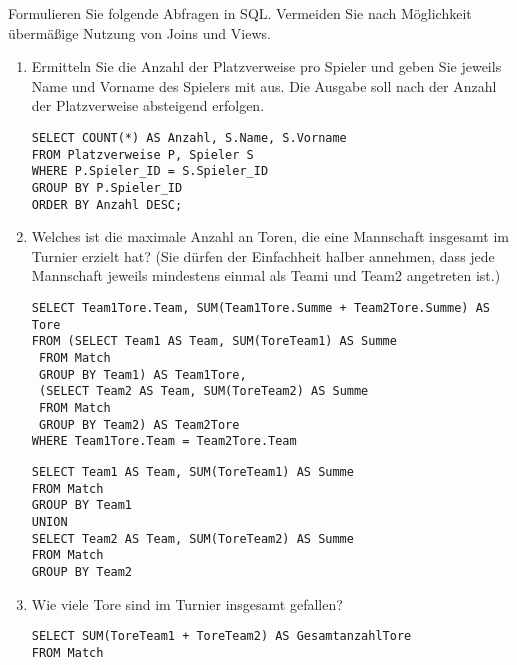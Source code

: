 \documentclass{lehramt-informatik-aufgabe}
\begin{document}
Formulieren Sie folgende Abfragen in SQL. Vermeiden Sie nach Möglichkeit
übermäßige Nutzung von Joins und Views.
\begin{enumerate}


\item Ermitteln Sie die Anzahl der Platzverweise pro Spieler und geben
Sie jeweils Name und Vorname des Spielers mit aus. Die Ausgabe soll nach
der Anzahl der Platzverweise absteigend erfolgen.

\begin{liAntwort}
\begin{verbatim}
SELECT COUNT(*) AS Anzahl, S.Name, S.Vorname
FROM Platzverweise P, Spieler S
WHERE P.Spieler_ID = S.Spieler_ID
GROUP BY P.Spieler_ID
ORDER BY Anzahl DESC;
\end{verbatim}
\end{liAntwort}


\item Welches ist die maximale Anzahl an Toren, die eine Mannschaft
insgesamt im Turnier erzielt hat? (Sie dürfen der Einfachheit halber
annehmen, dass jede Mannschaft jeweils mindestens einmal als Teami und
Team2 angetreten ist.)

\begin{liAntwort}
\begin{verbatim}
SELECT Team1Tore.Team, SUM(Team1Tore.Summe + Team2Tore.Summe) AS Tore
FROM (SELECT Team1 AS Team, SUM(ToreTeam1) AS Summe
 FROM Match
 GROUP BY Team1) AS Team1Tore,
 (SELECT Team2 AS Team, SUM(ToreTeam2) AS Summe
 FROM Match
 GROUP BY Team2) AS Team2Tore
WHERE Team1Tore.Team = Team2Tore.Team
\end{verbatim}

\begin{verbatim}
SELECT Team1 AS Team, SUM(ToreTeam1) AS Summe
FROM Match
GROUP BY Team1
UNION
SELECT Team2 AS Team, SUM(ToreTeam2) AS Summe
FROM Match
GROUP BY Team2
\end{verbatim}
\end{liAntwort}


\item Wie viele Tore sind im Turnier insgesamt gefallen?

\begin{liAntwort}
\begin{verbatim}
SELECT SUM(ToreTeam1 + ToreTeam2) AS GesamtanzahlTore
FROM Match
\end{verbatim}
\end{liAntwort}


\end{enumerate}
\end{document}
